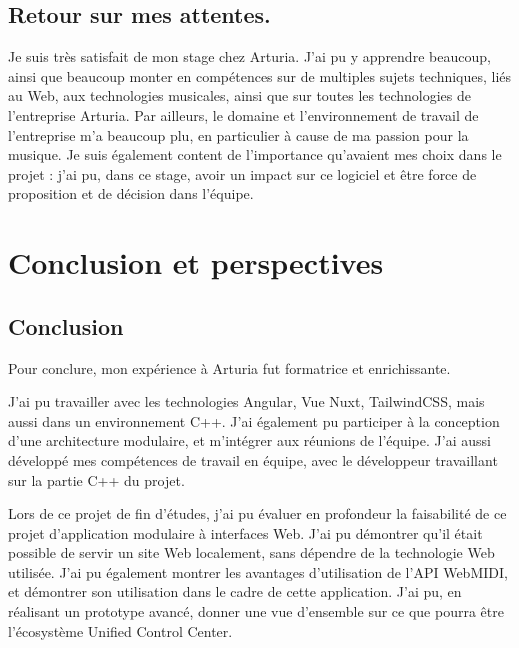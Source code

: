 \documentclass[francais]{rapportPFE}  %
\begin{document}
\subsection{Retour sur mes attentes.}
Je suis très satisfait de mon stage chez Arturia. J'ai pu y apprendre beaucoup, ainsi que beaucoup monter en compétences sur de multiples sujets techniques, liés au Web, aux technologies musicales, ainsi que sur toutes les technologies de l'entreprise Arturia.
Par ailleurs, le domaine et l'environnement de travail de l'entreprise m'a beaucoup plu, en particulier à cause de ma passion pour la musique.
Je suis également content de l'importance qu'avaient mes choix dans le projet : j'ai pu, dans ce stage, avoir un impact sur ce logiciel et être force de proposition et de décision dans l'équipe. 






\section{Conclusion et perspectives}
\subsection{Conclusion}

Pour conclure, mon expérience à Arturia fut formatrice et enrichissante.

J'ai pu travailler avec les technologies Angular, Vue Nuxt, TailwindCSS, mais aussi dans un environnement C++. J'ai également pu participer à la conception d'une architecture modulaire, et m'intégrer aux réunions de l'équipe. J'ai aussi développé mes compétences de travail en équipe, avec le développeur travaillant sur la partie C++ du projet.

Lors de ce projet de fin d'études, j'ai pu évaluer en profondeur la faisabilité de ce projet d'application modulaire à interfaces Web. J'ai pu démontrer qu'il était possible de servir un site Web localement, sans dépendre de la technologie Web utilisée. J'ai pu également montrer les avantages d'utilisation de l'API WebMIDI, et démontrer son utilisation dans le cadre de cette application. J'ai pu, en réalisant un prototype avancé, donner une vue d'ensemble sur ce que pourra être l'écosystème Unified Control Center. 
\end{document}
